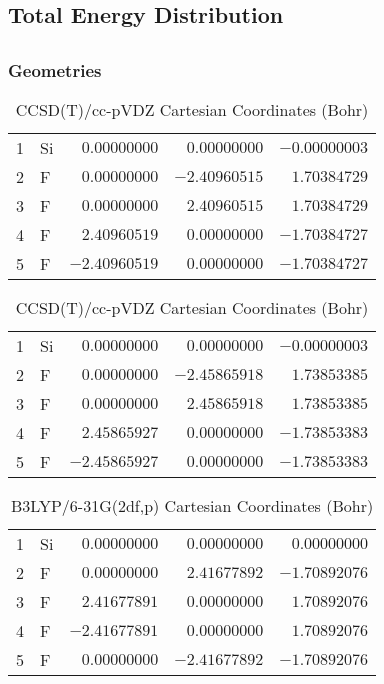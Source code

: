 \documentclass[10pt,oneside]{article}
\begin{document}
\begin{table}
\subsection*{Total Energy Distribution}
\centering\end{table}

\clearpage

\subsection{}

\begin{table}[h!]
\subsubsection*{Geometries}
\begin{multicols}{2}
\centering
\caption{CCSD(T)/cc-pVTZ Cartesian Coordinates (Bohr)}
\begin{tabular}{llrrr}
\toprule
1  & Si & $ 0.00000000$ & $ 0.00000000$ & $-0.00000003$ \\
2  & F  & $ 0.00000000$ & $-2.40960515$ & $ 1.70384729$ \\
3  & F  & $ 0.00000000$ & $ 2.40960515$ & $ 1.70384729$ \\
4  & F  & $ 2.40960519$ & $ 0.00000000$ & $-1.70384727$ \\
5  & F  & $-2.40960519$ & $ 0.00000000$ & $-1.70384727$ \\
\bottomrule
\end{tabular}
\caption{CCSD(T)/cc-pVDZ Cartesian Coordinates (Bohr)}
\begin{tabular}{llrrr}
\toprule
1  & Si & $ 0.00000000$ & $ 0.00000000$ & $-0.00000003$ \\
2  & F  & $ 0.00000000$ & $-2.45865918$ & $ 1.73853385$ \\
3  & F  & $ 0.00000000$ & $ 2.45865918$ & $ 1.73853385$ \\
4  & F  & $ 2.45865927$ & $ 0.00000000$ & $-1.73853383$ \\
5  & F  & $-2.45865927$ & $ 0.00000000$ & $-1.73853383$ \\
\bottomrule
\end{tabular}
\end{multicols}
\end{table}

\begin{table}[h]
\centering
\caption{B3LYP/6-31G(2df,p) Cartesian Coordinates (Bohr)}
\begin{tabular}{llrrr}
\toprule
1  & Si & $ 0.00000000$ & $ 0.00000000$ & $ 0.00000000$ \\
2  & F  & $ 0.00000000$ & $ 2.41677892$ & $-1.70892076$ \\
3  & F  & $ 2.41677891$ & $ 0.00000000$ & $ 1.70892076$ \\
4  & F  & $-2.41677891$ & $ 0.00000000$ & $ 1.70892076$ \\
5  & F  & $ 0.00000000$ & $-2.41677892$ & $-1.70892076$ \\
\bottomrule
\end{tabular}
\end{table}
\end{document}
